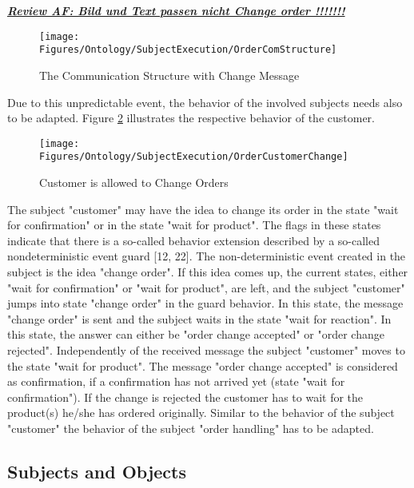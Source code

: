 \underline{\textit{\textbf{Review AF: Bild und Text passen nicht Change order !!!!!!!}}}



\begin{figure}[htbp]
	\centering
	\texttt{[image: Figures/Ontology/SubjectExecution/OrderComStructure]}
	\caption[The Communication Structure with Change Message]{The Communication Structure with Change Message}
	\label{fig:ordercomstructure}
\end{figure}

Due to this unpredictable event, the behavior of the involved subjects needs also to be adapted. Figure \ref{fig:ordercustomerchange} illustrates the respective behavior of the customer. 

\begin{figure}[htbp]
	\centering
	\texttt{[image: Figures/Ontology/SubjectExecution/OrderCustomerChange]}
	\caption[Customer is allowed to Change Orders]{Customer is allowed to Change Orders}
	\label{fig:ordercustomerchange}
\end{figure}

The subject "customer" may have the idea to change its order in the state "wait for confirmation" or in the state "wait for product". The flags in these states indicate that there is a so-called behavior extension described by a so-called nondeterministic event guard [12, 22]. The non-deterministic event created in the subject is the idea "change order". If this idea comes up, the current states, either "wait for confirmation" or "wait for product", are left, and the subject "customer" jumps into state "change order" in the guard behavior. In this state, the message "change order" is sent and the subject waits in the state "wait for reaction". In this state, the answer can either be "order change accepted" or "order change rejected". Independently of the received message the subject "customer" moves to the state "wait for product". The message "order change accepted" is considered as confirmation, if a confirmation has not arrived yet (state "wait for confirmation"). If the change is rejected the customer has to wait for the product(s) he/she has ordered originally. Similar to the behavior of the subject "customer" the behavior of the subject "order handling" has to be adapted.

\subsection{Subjects and Objects}
\label{SUbjects-Objects}

